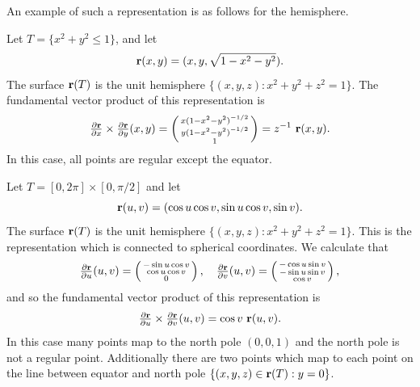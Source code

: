An example of such a representation is as follows for the hemisphere.

\begin{example*}
    Let \( T=\{x^2+y^2 \leq 1\}\), and let
    \[
        \mathbf{r}(x,y)=(x,y,\sqrt{1-x^2 -y^2}).
    \]
    The surface \(\mathbf{r}(T)\) is the unit hemisphere \(\{(x,y,z): x^2 + y^2 + z^2 = 1\}\).
    The fundamental vector product of this representation is
    \[
        \tfrac{\partial \mathbf{r}}{\partial x} \times \tfrac{\partial \mathbf{r}}{\partial y}(x,y)
        =
        \left(\begin{smallmatrix}
                {x {(1-x^2-y^2)}^{-1/2}} \\ {y {(1-x^2-y^2)}^{-1/2}}  \\ { 1}
            \end{smallmatrix}\right)
        = {z^{-1}} \ \mathbf{r}(x,y).
    \]
    In this case, all points are regular except the equator.
\end{example*}

\begin{example*}
    Let \( T = [0,2\pi]\times [0,\pi/2]\) and let
    \[
        \mathbf{r}(u,v) = (\cos u \cos v, \sin u \cos v, \sin v).
    \]
    The surface \(\mathbf{r}(T)\) is the unit hemisphere  \(\{(x,y,z): x^2 + y^2 + z^2 = 1\}\).
    This is the representation which is connected to spherical coordinates.
    We calculate that
    \[
        \tfrac{\partial \mathbf{r}}{\partial u}(u,v) = \left(\begin{smallmatrix}
                -\sin u \cos v \\ \cos u \cos v  \\ 0
            \end{smallmatrix}\right),
        \quad
        \tfrac{\partial \mathbf{r}}{\partial v}(u,v) = \left(\begin{smallmatrix}
                {-\cos u \sin v} \\ {-\sin u \sin v } \\ {\cos v}
            \end{smallmatrix}\right),
    \]
    and so the fundamental vector product of this representation is
    \[
        \tfrac{\partial \mathbf{r}}{\partial u} \times \tfrac{\partial \mathbf{r}}{\partial v}(u,v)
        = {\cos v }\ \mathbf{r}(u,v).
    \]
    In this case many points map to the north pole \((0,0,1)\) and the north pole is not a regular point.
    Additionally there are two points which map to each point on the line between equator and north pole \(\{(x,y,z)\in \mathbf{r}(T): y=0\}\).
\end{example*}


